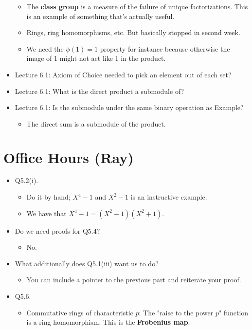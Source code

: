 \documentclass[../notes.tex]{subfiles}
\begin{document}
\begin{itemize}
\begin{itemize}
        \item The \textbf{class group} is a measure of the failure of unique factorizations. This is an example of something that's actually useful.
        \item Rings, ring homomorphisms, etc. But basically stopped in second week.
        \item We need the $\phi(1)=1$ property for instance because otherwise the image of 1 might not act like 1 in the product.
    \end{itemize}
    \item Lecture 6.1: Axiom of Choice needed to pick an element out of each set?
    \item Lecture 6.1: What is the direct product a submodule of?
    \item Lecture 6.1: Is the submodule under the same binary operation as Example?
    \begin{itemize}
        \item The direct sum is a submodule of the product.
    \end{itemize}
\end{itemize}



\section{Office Hours (Ray)}
\begin{itemize}
    \item Q5.2(i).
    \begin{itemize}
        \item Do it by hand; $X^4-1$ and $X^2-1$ is an instructive example.
        \item We have that $X^4-1=(X^2-1)(X^2+1)$.
    \end{itemize}
    \item Do we need proofs for Q5.4?
    \begin{itemize}
        \item No.
    \end{itemize}
    \item What additionally does Q5.1(iii) want us to do?
    \begin{itemize}
        \item You can include a pointer to the previous part and reiterate your proof.
    \end{itemize}
    \item Q5.6.
    \begin{itemize}
        \item Commutative rings of characteristic $p$: The "raise to the power $p$" function is a ring homomorphism. This is the \textbf{Frobenius map}.
    \end{itemize}
\end{itemize}
\end{document}

